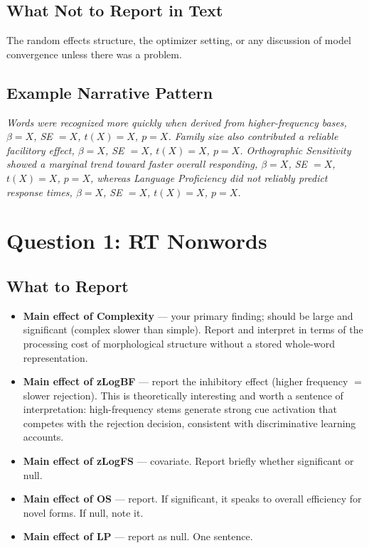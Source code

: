 \documentclass[12pt]{article}
\begin{document}
\subsection*{What Not to Report in Text}

The random effects structure, the optimizer setting, or any discussion of model convergence unless there was a problem.

\subsection*{Example Narrative Pattern}

\textit{Words were recognized more quickly when derived from higher-frequency bases, $\beta = X$, SE $= X$, $t(X) = X$, $p = X$. Family size also contributed a reliable facilitory effect, $\beta = X$, SE $= X$, $t(X) = X$, $p = X$. Orthographic Sensitivity showed a marginal trend toward faster overall responding, $\beta = X$, SE $= X$, $t(X) = X$, $p = X$, whereas Language Proficiency did not reliably predict response times, $\beta = X$, SE $= X$, $t(X) = X$, $p = X$.}

\section*{Question 1: RT Nonwords}

\subsection*{What to Report}

\begin{itemize}
    \item \textbf{Main effect of Complexity} --- your primary finding; should be large and significant (complex slower than simple). Report and interpret in terms of the processing cost of morphological structure without a stored whole-word representation.
    \item \textbf{Main effect of zLogBF} --- report the inhibitory effect (higher frequency $=$ slower rejection). This is theoretically interesting and worth a sentence of interpretation: high-frequency stems generate strong cue activation that competes with the rejection decision, consistent with discriminative learning accounts.
    \item \textbf{Main effect of zLogFS} --- covariate. Report briefly whether significant or null.
    \item \textbf{Main effect of OS} --- report. If significant, it speaks to overall efficiency for novel forms. If null, note it.
    \item \textbf{Main effect of LP} --- report as null. One sentence.
\end{itemize}
\end{document}
